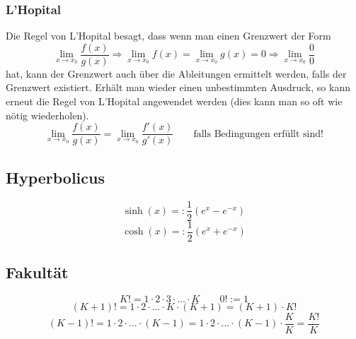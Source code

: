 \subsubsection{L'Hopital}
Die Regel von L'Hopital besagt, dass wenn man einen Grenzwert der Form 
\[ \lim\limits_{x \rightarrow x_0} \frac{f(x)}{g(x)} \Rightarrow 
\lim\limits_{x \rightarrow x_0} f(x) = \lim\limits_{x \rightarrow x_0} g(x) = 0 
\Rightarrow \lim\limits_{x \rightarrow x_0} \frac{0}{0} \] hat, kann der 
Grenzwert auch über die Ableitungen ermittelt werden, falls der Grenzwert 
existiert.
Erhält man wieder einen unbestimmten Ausdruck, so kann erneut die Regel von 
L'Hopital angewendet werden (dies kann man so oft wie nötig wiederholen).
\[ \boxed{ \lim\limits_{x \rightarrow x_0} \frac{f(x)}{g(x)} 
= \lim\limits_{x \rightarrow x_0} \frac{f'(x)}{g'(x)} \quad} \quad 
\text{falls Bedingungen erfüllt sind!}\]

\subsection{Hyperbolicus}
\[ \boxed{\sinh(x) =: \frac{1}{2}\left(e^x - e^{-x} \right) }\]
\[ \boxed{\cosh(x) =: \frac{1}{2}\left(e^x + e^{-x} \right) }\]

\subsection{Fakultät}
\[ \boxed{K! = 1 \cdot 2 \cdot 3\cdot \ldots \cdot K} \qquad \boxed{0! := 1} \]
\[ \boxed{(K + 1)! = 1  \cdot 2 \cdot \ldots \cdot K \cdot (K + 1) = (K + 1) 
\cdot K!} \]
\[ \boxed{(K - 1)! = 1  \cdot 2 \cdot \ldots \cdot (K - 1) = 1  \cdot 2 \cdot 
\ldots \cdot (K - 1) \cdot \frac{K}{K} = \frac{K!}{K}} \]
